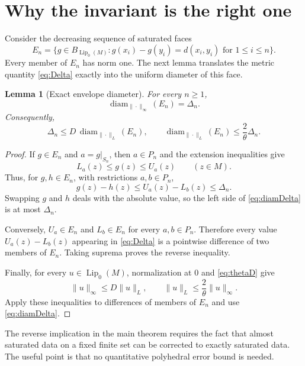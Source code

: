 \documentclass[11pt]{article}
\newtheorem{lemma}{Lemma}
\newcommand{\Lip}{\operatorname{Lip}_0}
\newcommand{\diam}{\operatorname{diam}}
\begin{document}
\section{Why the invariant is the right one}

Consider the decreasing sequence of saturated faces
\begin{equation}
 E_n=\{g\in B_{\Lip(M)}:
       g(x_i)-g(y_i)=d(x_i,y_i)\text{ for }1\leq i\leq n\}.
 \label{eq:En}
\end{equation}
Every member of $E_n$ has norm one. The next lemma translates the metric
quantity \eqref{eq:Delta} exactly into the uniform diameter of this face.

\begin{lemma}[Exact envelope diameter]
For every $n\geq1$,
\begin{equation}
 \diam_{\|\cdot\|_\infty}(E_n)=\Delta_n.
 \label{eq:diamDelta}
\end{equation}
Consequently,
\begin{equation}
 \Delta_n\leq D\,\diam_{\|\cdot\|_L}(E_n),
 \qquad
 \diam_{\|\cdot\|_L}(E_n)\leq\frac{2}{\theta}\Delta_n.
 \label{eq:normcompareEn}
\end{equation}
\end{lemma}

\begin{proof}
If $g\in E_n$ and $a=g|_{S_n}$, then $a\in P_n$ and the extension
inequalities give
\[
 L_a(z)\leq g(z)\leq U_a(z)\qquad(z\in M).
\]
Thus, for $g,h\in E_n$, with restrictions $a,b\in P_n$,
\[
 g(z)-h(z)\leq U_a(z)-L_b(z)\leq\Delta_n.
\]
Swapping $g$ and $h$ deals with the absolute value, so the left side of
\eqref{eq:diamDelta} is at most $\Delta_n$.

Conversely, $U_a\in E_n$ and $L_b\in E_n$ for every $a,b\in P_n$.
Therefore every value $U_a(z)-L_b(z)$ appearing in \eqref{eq:Delta} is a
pointwise difference of two members of $E_n$. Taking suprema proves the
reverse inequality.

Finally, for every $u\in\Lip(M)$, normalization at $0$ and
\eqref{eq:thetaD} give
\begin{equation}
 \|u\|_\infty\leq D\|u\|_L,
 \qquad
 \|u\|_L\leq\frac{2}{\theta}\|u\|_\infty.
 \label{eq:normcomparison}
\end{equation}
Apply these inequalities to differences of members of $E_n$ and use
\eqref{eq:diamDelta}.
\end{proof}

The reverse implication in the main theorem requires the fact that almost
saturated data on a fixed finite set can be corrected to exactly saturated
data. The useful point is that no quantitative polyhedral error bound is
needed.
\end{document}
